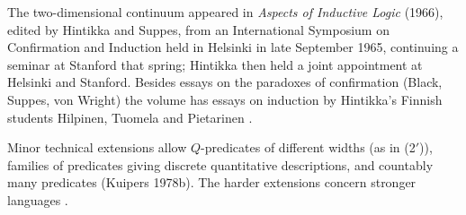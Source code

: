 The two-dimensional continuum appeared in \emph{Aspects of Inductive
Logic} (1966), edited by Hintikka and Suppes, from an International
Symposium on Confirmation and Induction held in Helsinki in late
September 1965, continuing a seminar at Stanford that spring; Hintikka
then held a joint appointment at Helsinki and Stanford. Besides essays on
the paradoxes of confirmation (Black, Suppes, von Wright) the volume has
essays on induction by Hintikka's Finnish students Hilpinen, Tuomela and
Pietarinen \cite[pp.~325--326]{Niiniluoto2011HintikkaProgramReading}.

Minor technical extensions allow \(Q\)-predicates of different widths
(as in (2\('\))), families of predicates giving discrete quantitative
descriptions, and countably many predicates (Kuipers 1978b). The harder
extensions concern stronger languages \cite[p.~326]{Niiniluoto2011HintikkaProgramReading}.
